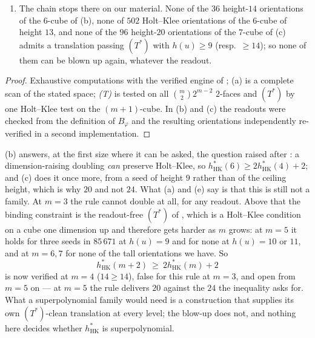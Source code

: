\begin{proposition}
\begin{enumerate}
\[\]
with $z=21$, $u=28$, $h(u)=8$ passes \emph{(T)} on all $80$ of its
$2$-faces, satisfies \emph{(P$_\varphi$)} for a readout, and yet admits
no Holt--Klee blow-up at all: $D(s,21)$ fails Holt--Klee on the $4$-face
$\{x_0,x_3,x_4,x_5\}$ at the origin, and every \emph{(P)}-feasible readout
leaves a defect of exactly three faces of $B_\varphi(s,21)$, the two
$4$-faces on $\{x_0,x_3,x_4,\alpha\}$ and $\{x_0,x_3,x_4,\beta\}$ at the
origin and the $5$-face containing them. Only $188$ of the $85\,671$ pass
$(T^{\ast})$ with $h(u)\ge6$, and just $3$ with $h(u)=9$.
\item[(e)] The chain stops there on our material. None of the $36$
height-$14$ orientations of the $6$-cube of (b), none of $502$ Holt--Klee
orientations of the $6$-cube of height $13$, and none of the $96$
height-$20$ orientations of the $7$-cube of (c) admits a translation
passing $(T^{\ast})$ with $h(u)\ge9$ (resp.\ $\ge14$); so none of them can
be blown up again, whatever the readout.
\end{enumerate}
\end{proposition}

\begin{proof}
Exhaustive computations with the verified engine of
; (a) is a complete scan of the stated space;
\emph{(T)} is tested on all $\binom m2 2^{m-2}$ $2$-faces and
$(T^{\ast})$ by one Holt--Klee test on the $(m+1)$-cube. In (b) and (c)
the readouts were checked from the definition of $B_\varphi$ and the
resulting orientations independently re-verified in a second
implementation.
\end{proof}

\begin{remark}\label{hkd:rem-doubling}
(b) answers, at the first size where it can be
asked, the question raised after : a
dimension-raising doubling \emph{can} preserve Holt--Klee, so
$h^{\ast}_{\mathrm{HK}}(6)\ge2h^{\ast}_{\mathrm{HK}}(4)+2$; and (c) does
it once more, from a seed of height $9$ rather than of the ceiling
height, which is why $20$ and not $24$. What (a) and (e) say is that this
is still not a family. At $m=3$ the rule cannot double at all, for any
readout. Above that the binding constraint is the readout-free
$(T^{\ast})$ of , which is a Holt--Klee condition on
a cube one dimension up and therefore gets harder as $m$ grows: at $m=5$
it holds for three seeds in $85\,671$ at $h(u)=9$ and for none at $h(u)=10$
or $11$, and at $m=6,7$ for none of the tall orientations we have. So
\[
  h^{\ast}_{\mathrm{HK}}(m+2)\ \ge\ 2h^{\ast}_{\mathrm{HK}}(m)+2
\]
is now verified at $m=4$ ($14\ge14$), false for this rule at $m=3$, and
open from $m=5$ on --- at $m=5$ the rule delivers $20$ against the
$24$ the inequality asks for. What a superpolynomial family would need is
a construction that supplies its own $(T^{\ast})$-clean translation at
every level; the blow-up does not, and nothing here decides whether
$h^{\ast}_{\mathrm{HK}}$ is superpolynomial.
\end{remark}

